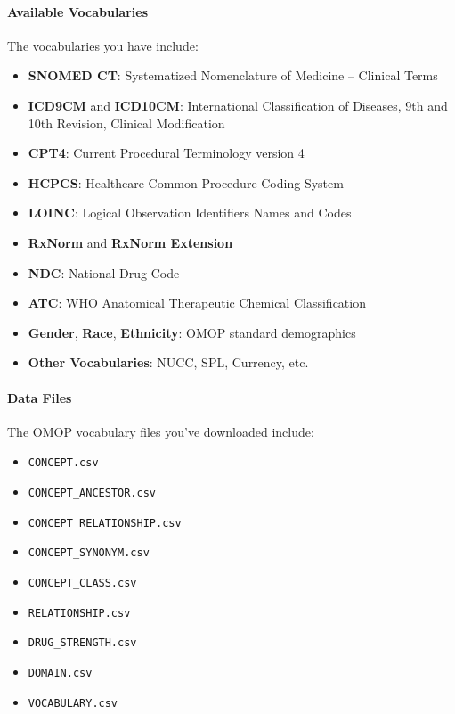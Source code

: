 \documentclass[12pt, a4paper]{article}
\begin{document}
\paragraph{Available Vocabularies}

The vocabularies you have include:

\begin{itemize}
    \item \textbf{SNOMED CT}: Systematized Nomenclature of Medicine -- Clinical Terms
    \item \textbf{ICD9CM} and \textbf{ICD10CM}: International Classification of Diseases, 9th and 10th Revision, Clinical Modification
    \item \textbf{CPT4}: Current Procedural Terminology version 4
    \item \textbf{HCPCS}: Healthcare Common Procedure Coding System
    \item \textbf{LOINC}: Logical Observation Identifiers Names and Codes
    \item \textbf{RxNorm} and \textbf{RxNorm Extension}
    \item \textbf{NDC}: National Drug Code
    \item \textbf{ATC}: WHO Anatomical Therapeutic Chemical Classification
    \item \textbf{Gender}, \textbf{Race}, \textbf{Ethnicity}: OMOP standard demographics
    \item \textbf{Other Vocabularies}: NUCC, SPL, Currency, etc.
\end{itemize}

\paragraph{Data Files}

The OMOP vocabulary files you've downloaded include:

\begin{itemize}
    \item \texttt{CONCEPT.csv}
    \item \texttt{CONCEPT\_ANCESTOR.csv}
    \item \texttt{CONCEPT\_RELATIONSHIP.csv}
    \item \texttt{CONCEPT\_SYNONYM.csv}
    \item \texttt{CONCEPT\_CLASS.csv}
    \item \texttt{RELATIONSHIP.csv}
    \item \texttt{DRUG\_STRENGTH.csv}
    \item \texttt{DOMAIN.csv}
    \item \texttt{VOCABULARY.csv}
\end{itemize}
\end{document}
